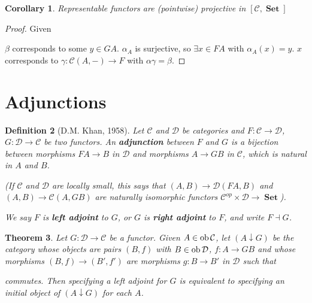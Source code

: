 \documentclass[a4paper]{article}
\newtheorem{definition}{Definition}
\newtheorem{corollary}[definition]{Corollary}
\newtheorem{theorem}[definition]{Theorem}
\numberwithin{definition}{section}
\newcommand*\ob[1]{\textnormal{ob}\,#1}
\DeclareMathOperator{\Set}{\textbf{Set}}
\begin{document}
\begin{corollary}
	Representable functors are (pointwise) projective in $[\mathcal{C}, \Set]$
\end{corollary}
\begin{proof}
	Given
	\begin{center}
	\end{center}
	$\beta$ corresponds to some $y \in GA$. 
	$\alpha_A$ is surjective, so $\exists x \in FA$ with $\alpha_A(x)=y$.
	$x$ corresponds to $\gamma: \mathcal{C}(A, -) \to F$ with $\alpha\gamma = \beta$.
\end{proof}

\section{Adjunctions}
\begin{definition}[D.M. Khan, 1958]
	Let $\mathcal{C}$ and $\mathcal{D}$ be categories and $F: \mathcal{C} \to \mathcal{D}$, $G: \mathcal{D} \to \mathcal{C}$ be two functors.
	An \textbf{adjunction} between $F$ and $G$ is a bijection between morphisms $FA \to B$ in $\mathcal{D}$ and morphisms $A \to GB$ in $\mathcal{C}$, 
	which is natural in $A$ and $B$.

	(If $\mathcal{C}$ and $\mathcal{D}$ are locally small,
	this says that $(A, B) \to \mathcal{D}(FA, B)$ and $(A, B) \to \mathcal{C}(A, GB)$
	are naturally isomorphic functors $\mathcal{C}^{op} \times \mathcal{D} \to \Set$).
	
	We say $F$ is \textbf{left adjoint} to $G$,
	or $G$ is \textbf{right adjoint} to $F$,
	and write $F \dashv G$.
\end{definition}

\begin{theorem}
	Let $G: \mathcal{D} \to \mathcal{C}$ be a functor.
	Given $A \in \ob \mathcal{C}$,
	let $(A \downarrow G)$ be the category whose objects are pairs $(B, f)$
	with $B \in \ob \mathcal{D}$,
	$f: A \to GB$ and whose morphisms $(B, f) \to (B', f')$
	are morphisms $g: B \to B'$ in $\mathcal{D}$ such that
	\begin{center}
	\end{center}
	commutes.
	Then specifying a left adjoint for $G$ is equivalent to specifying an initial object of $(A \downarrow G)$ for each $A$.
\end{theorem}
\end{document}
